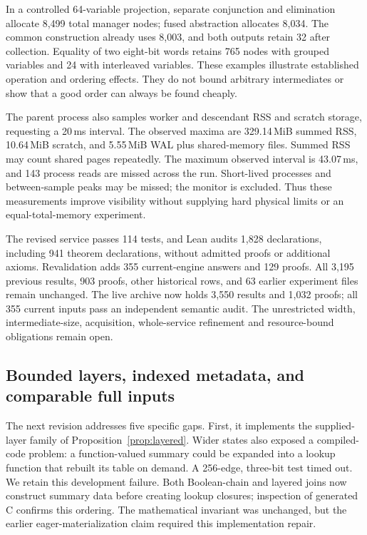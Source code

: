 \documentclass[11pt,a4paper]{article}
\numberwithin{equation}{section}
\theoremstyle{plain}
\theoremstyle{definition}
\theoremstyle{remark}
\begin{document}
In a controlled 64-variable projection, separate conjunction and elimination allocate 8,499 total manager nodes; fused abstraction allocates 8,034. The common construction already uses 8,003, and both outputs retain 32 after collection. Equality of two eight-bit words retains 765 nodes with grouped variables and 24 with interleaved variables. These examples illustrate established operation and ordering effects. They do not bound arbitrary intermediates or show that a good order can always be found cheaply.

The parent process also samples worker and descendant RSS and scratch storage, requesting a 20\,ms interval. The observed maxima are 329.14\,MiB summed RSS, 10.64\,MiB scratch, and 5.55\,MiB WAL plus shared-memory files. Summed RSS may count shared pages repeatedly. The maximum observed interval is 43.07\,ms, and 143 process reads are missed across the run. Short-lived processes and between-sample peaks may be missed; the monitor is excluded. Thus these measurements improve visibility without supplying hard physical limits or an equal-total-memory experiment.

The revised service passes 114 tests, and Lean audits 1,828 declarations, including 941 theorem declarations, without admitted proofs or additional axioms. Revalidation adds 355 current-engine answers and 129 proofs. All 3,195 previous results, 903 proofs, other historical rows, and 63 earlier experiment files remain unchanged. The live archive now holds 3,550 results and 1,032 proofs; all 355 current inputs pass an independent semantic audit. The unrestricted width, intermediate-size, acquisition, whole-service refinement and resource-bound obligations remain open.

\subsection{Bounded layers, indexed metadata, and comparable full inputs}
\label{sec:structured-study}

The next revision addresses five specific gaps. First, it implements the supplied-layer family of Proposition~\ref{prop:layered}. Wider states also exposed a compiled-code problem: a function-valued summary could be expanded into a lookup function that rebuilt its table on demand. A 256-edge, three-bit test timed out. We retain this development failure. Both Boolean-chain and layered joins now construct summary data before creating lookup closures; inspection of generated C confirms this ordering. The mathematical invariant was unchanged, but the earlier eager-materialization claim required this implementation repair.
\end{document}

